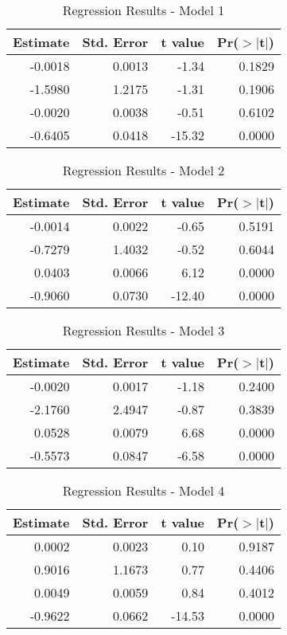 \begin{table}[ht]
\centering
\begin{tabular}{rrrr}
  \hline
Estimate & Std. Error & t value & Pr($>$$|$t$|$) \\ 
  \hline
-0.0018 & 0.0013 & -1.34 & 0.1829 \\ 
  -1.5980 & 1.2175 & -1.31 & 0.1906 \\ 
  -0.0020 & 0.0038 & -0.51 & 0.6102 \\ 
  -0.6405 & 0.0418 & -15.32 & 0.0000 \\ 
   \hline
\end{tabular}
\caption{Regression Results - Model 1} 
\end{table}
\begin{table}[ht]
\centering
\begin{tabular}{rrrr}
  \hline
Estimate & Std. Error & t value & Pr($>$$|$t$|$) \\ 
  \hline
-0.0014 & 0.0022 & -0.65 & 0.5191 \\ 
  -0.7279 & 1.4032 & -0.52 & 0.6044 \\ 
  0.0403 & 0.0066 & 6.12 & 0.0000 \\ 
  -0.9060 & 0.0730 & -12.40 & 0.0000 \\ 
   \hline
\end{tabular}
\caption{Regression Results - Model 2} 
\end{table}
\begin{table}[ht]
\centering
\begin{tabular}{rrrr}
  \hline
Estimate & Std. Error & t value & Pr($>$$|$t$|$) \\ 
  \hline
-0.0020 & 0.0017 & -1.18 & 0.2400 \\ 
  -2.1760 & 2.4947 & -0.87 & 0.3839 \\ 
  0.0528 & 0.0079 & 6.68 & 0.0000 \\ 
  -0.5573 & 0.0847 & -6.58 & 0.0000 \\ 
   \hline
\end{tabular}
\caption{Regression Results - Model 3} 
\end{table}
\begin{table}[ht]
\centering
\begin{tabular}{rrrr}
  \hline
Estimate & Std. Error & t value & Pr($>$$|$t$|$) \\ 
  \hline
0.0002 & 0.0023 & 0.10 & 0.9187 \\ 
  0.9016 & 1.1673 & 0.77 & 0.4406 \\ 
  0.0049 & 0.0059 & 0.84 & 0.4012 \\ 
  -0.9622 & 0.0662 & -14.53 & 0.0000 \\ 
   \hline
\end{tabular}
\caption{Regression Results - Model 4} 
\end{table}
